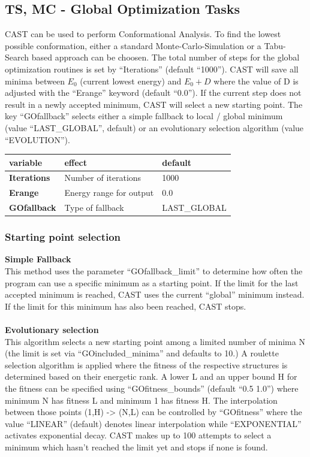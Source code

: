 \documentclass[10pt,a4paper]{article} %
\begin{document}
	\subsection{TS, MC - Global Optimization Tasks}
	\ac{CAST} can be used to perform Conformational Analysis. To find the lowest possible conformation, either a standard Monte-Carlo-Simulation\supercite{mc_original, mmc_original} or a Tabu-Search\cite{tabusearch_original1, tabusearch_original2, tabusearch_original3} based approach can be choosen. The total number of steps for the global optimization routines is set by ``Iterations'' (default ``1000''). \ac{CAST} will save all minima between $E_0$ (current lowest energy) and $E_0 + D$ where the value of D is adjusted with the ``Erange'' keyword (default ``0.0'').
	If the current step does not result in a newly accepted minimum, \ac{CAST} will select a new starting point. The key ``GOfallback'' selects either a simple fallback to local / global minimum (value ``LAST\_GLOBAL'', default) or an evolutionary selection algorithm (value ``EVOLUTION'').
	
	\begin{tabularx}{\textwidth}{l|X|X}
	variable & effect & default \\
	\hline
	\textbf{Iterations} & Number of iterations & 1000 \\
	\textbf{Erange} & Energy range for output & 0.0 \\
		\textbf{GOfallback} & Type of fallback & LAST\_GLOBAL \\
	\end{tabularx}
	
	\subsubsection{Starting point selection}
	\textbf{Simple Fallback} \\
	This method uses the parameter ``GOfallback\_limit'' to determine how often the program can use a specific minimum as a starting point. If the limit for the last accepted minimum is reached, \ac{CAST} uses the current ``global'' minimum instead. If the limit for this minimum has also been reached, \ac{CAST} stops.\\~\\
		
	\textbf{Evolutionary selection} \\
	This algorithm selects a new starting point among a limited number of minima N (the limit is set via ``GOincluded\_minima'' and defaults to 10.)
	A roulette selection algorithm is applied where the fitness of the respective structures is determined based on their energetic rank. A lower L and an upper bound H for the fitness can be specified using ``GOfitness\_bounds'' (default ``0.5 1.0'') where minimum N has fitness L and minimum 1 has fitness H.
	The interpolation between those points (1,H) -> (N,L) can be controlled by ``GOfitness'' where the value ``LINEAR'' (default) denotes linear interpolation while ``EXPONENTIAL'' activates exponential decay.
	\ac{CAST} makes up to 100 attempts to select a minimum which hasn't reached the limit yet and stops if none is found.
	
\end{document}
